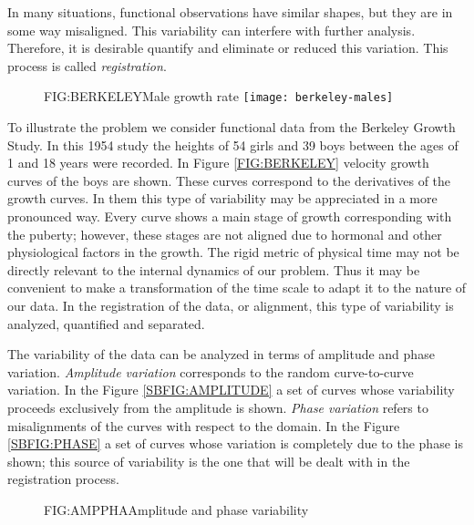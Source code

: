 In many situations, functional observations have
similar shapes, but they are in some way misaligned. This variability can
interfere with further analysis. Therefore, it is desirable quantify and
eliminate or reduced this variation. This process is called \textit{registration}.


\begin{figure}[Male growth rate]{FIG:BERKELEY}{Male growth rate}
	\texttt{[image: berkeley-males]}
\end{figure}

To illustrate the problem we consider functional data from the Berkeley Growth
Study\cite{berkeley}. In this 1954 study the heights of 54
girls and 39 boys between the ages of 1 and 18 years were recorded. In Figure
\ref{FIG:BERKELEY} velocity growth curves of the boys are shown.
These curves correspond to the derivatives of the growth curves. In them this
type of variability may be appreciated in a more pronounced way.
Every curve shows a main stage of growth corresponding with the puberty;
however, these stages are not aligned due to hormonal and other
physiological factors in the growth. The rigid metric of physical time may not
be directly relevant to the internal dynamics of our problem. Thus it may be
convenient to make a transformation of the time scale to adapt it to the nature
of our data. In the registration of the data, or alignment, this type of
variability is analyzed, quantified and separated.


The variability of the data can be analyzed in terms of amplitude and
phase variation. \textit{Amplitude variation} corresponds to the
random curve-to-curve variation.
In the Figure \ref{SBFIG:AMPLITUDE} a
set of curves whose variability proceeds exclusively from the amplitude is shown.
\textit{Phase variation} refers to
misalignments of the curves with respect to the
domain. In the Figure
\ref{SBFIG:PHASE} a set of curves whose variation is completely due
to the phase is shown; this source of variability is the one that will be dealt with in
the registration process.

\begin{figure}[Amplitude and phase variability]{FIG:AMPPHA}{Amplitude and phase variability}
   \quad
\end{figure}
